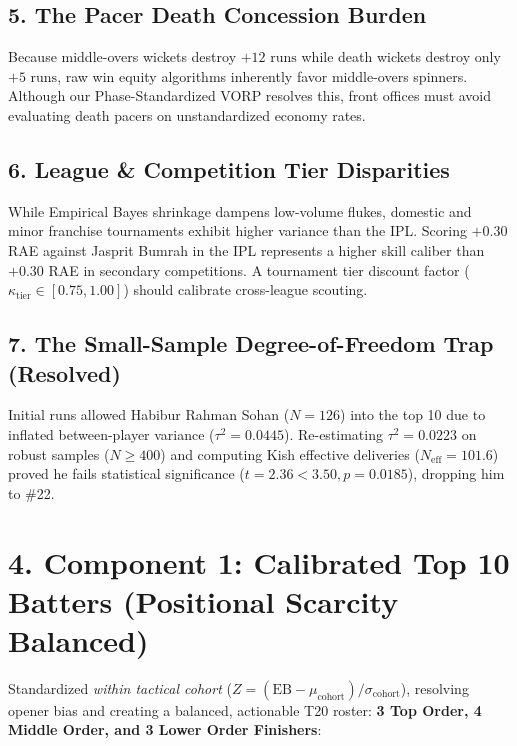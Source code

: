 \documentclass[10pt,a4paper]{article}
\begin{document}
\subsection*{5. The Pacer Death Concession Burden}
Because middle-overs wickets destroy $+12\text{ runs}$ while death wickets destroy only $+5\text{ runs}$, raw win equity algorithms inherently favor middle-overs spinners. Although our Phase-Standardized VORP resolves this, front offices must avoid evaluating death pacers on unstandardized economy rates.

\subsection*{6. League \& Competition Tier Disparities}
While Empirical Bayes shrinkage dampens low-volume flukes, domestic and minor franchise tournaments exhibit higher variance than the IPL. Scoring $+0.30$ RAE against Jasprit Bumrah in the IPL represents a higher skill caliber than $+0.30$ RAE in secondary competitions. A tournament tier discount factor ($\kappa_{\text{tier}} \in [0.75, 1.00]$) should calibrate cross-league scouting.

\subsection*{7. The Small-Sample Degree-of-Freedom Trap (Resolved)}
Initial runs allowed Habibur Rahman Sohan ($N=126$) into the top 10 due to inflated between-player variance ($\tau^2 = 0.0445$). Re-estimating $\tau^2 = 0.0223$ on robust samples ($N \ge 400$) and computing Kish effective deliveries ($N_{\text{eff}} = 101.6$) proved he fails statistical significance ($t = 2.36 < 3.50, p = 0.0185$), dropping him to \#22.

\clearpage

\section*{4. Component 1: Calibrated Top 10 Batters (Positional Scarcity Balanced)}

Standardized \textit{within tactical cohort} ($Z = (\text{EB} - \mu_{\text{cohort}})/\sigma_{\text{cohort}}$), resolving opener bias and creating a balanced, actionable T20 roster: \textbf{3 Top Order, 4 Middle Order, and 3 Lower Order Finishers}:
\end{document}

